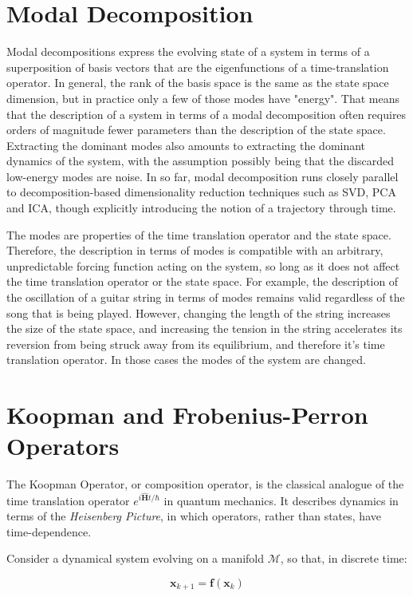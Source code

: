 \section{Modal Decomposition}
Modal decompositions express the evolving state of a system in terms of a superposition of basis vectors that are the eigenfunctions of a time-translation operator. In general, the rank of the basis space is the same as the state space dimension, but in practice only a few of those modes have "energy". That means that the description of a system in terms of a modal decomposition often requires orders of magnitude fewer parameters than the description of the state space. Extracting the dominant modes also amounts to extracting the dominant dynamics of the system, with the assumption possibly being that the discarded low-energy modes are noise. In so far, modal decomposition runs closely parallel to decomposition-based dimensionality reduction techniques such as SVD, PCA and ICA, though explicitly introducing the notion of a trajectory through time.

The modes are properties of the time translation operator and the state space. Therefore, the description in terms of modes is compatible with an arbitrary, unpredictable forcing function acting on the system, so long as it does not affect the time translation operator or the state space. For example, the description of the oscillation of a guitar string in terms of modes remains valid regardless of the song that is being played. However, changing the length of the string increases the size of the state space, and increasing the tension in the string accelerates its reversion from being struck away from its equilibrium, and therefore it's time translation operator. In those cases the modes of the system are changed.   


\section{Koopman and Frobenius-Perron Operators}
The Koopman Operator, or composition operator, is the classical analogue of the time translation operator $e^{i\mathbf{\hat{H}}t/\hbar}$ in quantum mechanics. It describes dynamics in terms of the \textit{Heisenberg Picture}, in which operators, rather than states, have time-dependence.

Consider a dynamical system evolving on a manifold $\mathscr{M}$, so that, in discrete time:

\begin{equation}
\mathbf{x}_{k+1} = \mathbf{f}(\mathbf{x}_{k})
\end{equation}

